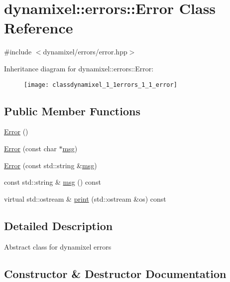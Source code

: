 \hypertarget{classdynamixel_1_1errors_1_1_error}{}\section{dynamixel\+:\+:errors\+:\+:Error Class Reference}
\label{classdynamixel_1_1errors_1_1_error}


{\ttfamily \#include $<$dynamixel/errors/error.\+hpp$>$}

Inheritance diagram for dynamixel\+:\+:errors\+:\+:Error\+:\begin{figure}[H]
\begin{center}
\leavevmode
\texttt{[image: classdynamixel\_1\_1errors\_1\_1\_error]}
\end{center}
\end{figure}
\subsection*{Public Member Functions}
\begin{DoxyCompactItemize}
\item 
\hyperlink{classdynamixel_1_1errors_1_1_error_a7d5d5cc0fea73ae2db4ca84035c7fbfe}{Error} ()
\item 
\hyperlink{classdynamixel_1_1errors_1_1_error_ad41dbbe9f237dbc204eba731de65be5a}{Error} (const char $\ast$\hyperlink{classdynamixel_1_1errors_1_1_error_a4c0804f137545e62204c49fca4c30dcb}{msg})
\item 
\hyperlink{classdynamixel_1_1errors_1_1_error_ab404696702c69bd2e8c49f6032a718f8}{Error} (const std\+::string \&\hyperlink{classdynamixel_1_1errors_1_1_error_a4c0804f137545e62204c49fca4c30dcb}{msg})
\item 
const std\+::string \& \hyperlink{classdynamixel_1_1errors_1_1_error_a4c0804f137545e62204c49fca4c30dcb}{msg} () const 
\item 
virtual std\+::ostream \& \hyperlink{classdynamixel_1_1errors_1_1_error_a12887a555c126d7e3a8ae8425730c8be}{print} (std\+::ostream \&os) const 
\end{DoxyCompactItemize}


\subsection{Detailed Description}
Abstract class for dynamixel errors 

\subsection{Constructor \& Destructor Documentation}
